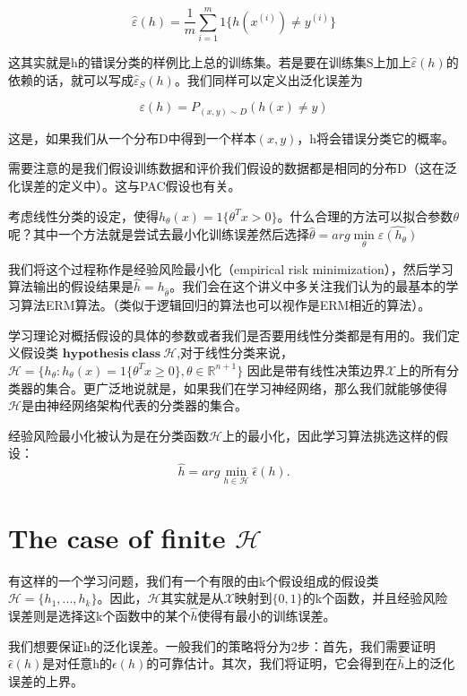 \documentclass[UTF8]{ctexart}
\begin{document}
\[  \hat{\varepsilon}(h) = \frac{1}{m} \sum_{i=1}^{m} 1 \{ h(x^{(i)}) \neq y^{(i)} \} \]


这其实就是h的错误分类的样例比上总的训练集。若是要在训练集S上加上$\hat{\varepsilon}(h)$的依赖的话，就可以写成$\hat{\varepsilon}_{S}(h)$。我们同样可以定义出泛化误差为 

\[ \varepsilon(h) = P_{(x,y)\sim D}(h(x) \neq y) \]

这是，如果我们从一个分布D中得到一个样本$(x,y)$，h将会错误分类它的概率。

需要注意的是我们假设训练数据和评价我们假设的数据都是相同的分布D（这在泛化误差的定义中）。这与PAC假设也有关。

考虑线性分类的设定，使得$h_{\theta}(x)=1\{ \theta^{T}x>0\}$。什么合理的方法可以拟合参数$\theta$呢？其中一个方法就是尝试去最小化训练误差然后选择$\hat{\theta}=arg \mathop{min}\limits_{\theta}\hat{\varepsilon(h_{\theta})}$

我们将这个过程称作是经验风险最小化（empirical risk minimization），然后学习算法输出的假设结果是$\hat{h}=h_{\hat{\theta}}$。我们会在这个讲义中多关注我们认为的最基本的学习算法ERM算法。（类似于逻辑回归的算法也可以视作是ERM相近的算法）。

学习理论对概括假设的具体的参数或者我们是否要用线性分类都是有用的。我们定义假设类 $\boldsymbol{hypothesis \ class}\ \mathcal{H}$,对于线性分类来说，$\mathcal{H} = \{ h_{\theta} : h_{\theta}(x) = 1\{\theta^{T}x \geq 0 \} , \theta \in  \mathbb{R}^{n+1} \}$ 因此是带有线性决策边界$\mathcal{X}$上的所有分类器的集合。更广泛地说就是，如果我们在学习神经网络，那么我们就能够使得$\mathcal{H}$是由神经网络架构代表的分类器的集合。

经验风险最小化被认为是在分类函数$\mathcal{H}$上的最小化，因此学习算法挑选这样的假设：\[\hat{h} = arg \mathop{min}\limits_{h\in \mathcal{H}} \hat{\epsilon}(h). \]



\section{The case of finite  $\mathcal{H}$}

有这样的一个学习问题，我们有一个有限的由k个假设组成的假设类$\mathcal{H} = \{ h_{1},...,h_{k}\}$。因此，$\mathcal{H}$其实就是从$\mathcal{X}$映射到$\{ 0,1\}$的k个函数，并且经验风险误差则是选择这k个函数中的某个$\hat{h}$使得有最小的训练误差。

我们想要保证h的泛化误差。一般我们的策略将分为2步：首先，我们需要证明$\hat{\epsilon}(h)$是对任意h的$\epsilon(h)$的可靠估计。其次，我们将证明，它会得到在$\hat{h}$上的泛化误差的上界。
\end{document}
